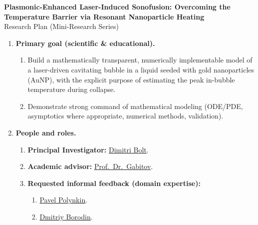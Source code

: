 \documentclass[11pt]{article}
\newcommand{\ProjectTitle}{Plasmonic-Enhanced Laser-Induced Sonofusion: Overcoming the Temperature Barrier via Resonant Nanoparticle Heating}
\newcommand{\PIName}{Dimitri Bolt}
\newcommand{\AdvisorName}{Prof.\ Dr.\ Gabitov}
\begin{document}
	
	\begin{center}
		{\LARGE \textbf{\ProjectTitle}}\\[0.75em]
		{\large Research Plan (Mini-Research Series)}\\[1.25em]
	\end{center}
	
	\begin{enumerate}
		\item \textbf{Primary goal (scientific \& educational).}
		\begin{enumerate}
			\item Build a mathematically transparent, numerically implementable model of a laser-driven cavitating bubble in a liquid seeded with gold nanoparticles (AuNP), with the explicit purpose of estimating the peak in-bubble temperature during collapse.
			\item Demonstrate strong command of mathematical modeling (ODE/PDE, asymptotics where appropriate, numerical methods, validation).
		\end{enumerate}
		
		\item \textbf{People and roles.}
		\begin{enumerate}
			\item \textbf{Principal Investigator:} \href{https://www.math.arizona.edu/people/dimitribolt}{\PIName}.
			\item \textbf{Academic advisor:} \href{https://math.arizona.edu/~gabitov/}{\AdvisorName}.
			\item \textbf{Requested informal feedback (domain expertise):}
			\begin{enumerate}
				\item \href{https://www.optics.arizona.edu/person/pavel-polynkin}{Pavel Polynkin}.
				\item \href{https://www.linkedin.com/in/dmitriy-borodin-5600b4136/}{Dmitriy Borodin}.
			\end{enumerate}
		\end{enumerate}
		

\end{enumerate}
\end{document}

